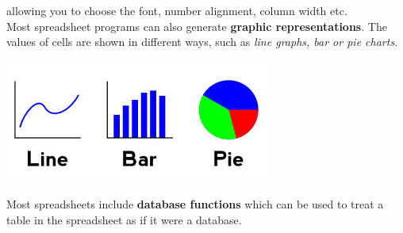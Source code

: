 \documentclass[a4paper,8pt]{article}
\begin{document}
allowing you to choose the font, number alignment, column width etc.\\
Most spreadsheet programs can also generate \textbf{graphic representations}. 
The values of cells are shown in different ways, such as \textsl{line graphs,
  bar or pie charts}.\\
\begin{center}
  \includegraphics[scale=0.5]{charts2}
\end{center}
Most spreadsheets include \textbf{database functions} which can be used to
treat a table in the spreadsheet as if it were a database.
\end{document}
